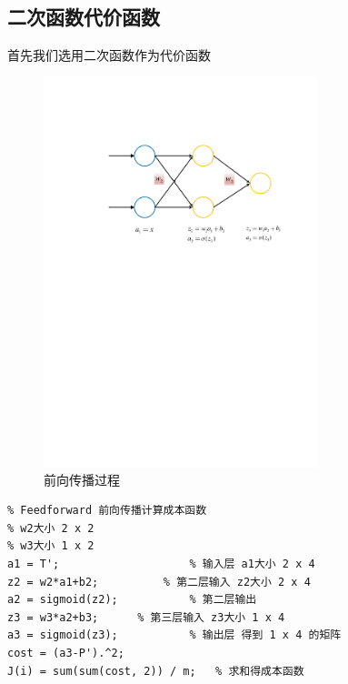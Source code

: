 \subsection{二次函数代价函数}
首先我们选用二次函数作为代价函数
\begin{figure}[H]
\centering
\includegraphics[width=8cm]{fig/Feedforward.pdf}
\caption{前向传播过程}
\end{figure}
\begin{lstlisting}
% Feedforward 前向传播计算成本函数
% w2大小 2 x 2
% w3大小 1 x 2
a1 = T'; 					% 输入层 a1大小 2 x 4
z2 = w2*a1+b2; 			% 第二层输入 z2大小 2 x 4
a2 = sigmoid(z2); 			% 第二层输出
z3 = w3*a2+b3;		% 第三层输入 z3大小 1 x 4
a3 = sigmoid(z3);			% 输出层 得到 1 x 4 的矩阵
cost = (a3-P').^2;
J(i) = sum(sum(cost, 2)) / m; 	% 求和得成本函数
\end{lstlisting}

